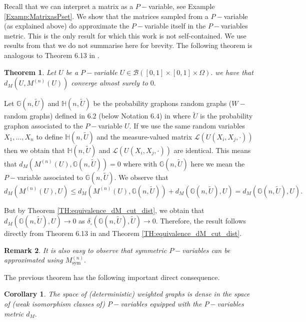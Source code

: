 \documentclass[11pt]{article}
\newtheorem{theorem}{Theorem}[section]
\newtheorem{corollary}{Corollary}[theorem]
\newtheorem{remark}[theorem]{Remark}
\newcommand{\cB}{{\mathcal B}}  %
\begin{document}
 Recall that we can interpret a matrix as a $P-$variable, see Example \ref{Examp:MatrixasPset}. We show that the matrices sampled from a $P-$variable (as explained above) do approximate the $P-$variable itself in the $P-$variables metric. This is the only result for which this work is not self-contained. We use results from \cite{abraham2023probabilitygraphons} that we do not summarise here for brevity. The following theorem is analogous to Theorem 6.13 in \cite{abraham2023probabilitygraphons}.

\begin{theorem}\label{ThmConVSubgraphs}
Let $U$ be a $P-$variable $U\in\cB([0,1]\times [0,1]\times \Omega).$ we have that $d_M(U,M^{(n)}(U))$ converge almost surely to $0.$ 
\end{theorem}
\proof
Let $\mathbb{G}(n,\widetilde U)$ and $\mathbb{H}(n,\widetilde U)$ be the probability graphons random graphs ($W-$random graphs) defined in $6.2$ (below Notation $6.4$) in \cite{abraham2023probabilitygraphons} where $\widetilde U$ is the probability graphon associated to the $P-$variable $U$. If we use the same random variables $X_1,\ldots,X_n$ to define $\mathbb{H}(n,\widetilde U)$ and the measure-valued matrix $\mathcal{L}(U(X_i,X_j,\cdot))$ then we obtain that $\mathbb{H}(n,\widetilde U)$ and $\mathcal{L}(U(X_i,X_j,\cdot))$ are identical. This means that $d_M(M^{(n)}(U), \mathbb{G}(n,\widetilde U))=0$ where with $\mathbb{G}(n,\widetilde U)$ here we mean the $P-$variable associated to $\mathbb{G}(n,\widetilde U).$ We observe that $$
d_M( M^{(n)}(U),U)\leq d_M(M^{(n)}(U), \mathbb{G}(n,\widetilde U))+d_M( \mathbb{G}(n,\widetilde U),U)=d_M( \mathbb{G}(n,\widetilde U),U).
$$

But by Theorem \ref{TH:equivalence_dM_cut_dist}, we obtain that $d_M( \mathbb{G}(n,\widetilde U),U)\rightarrow 0$ as $\delta_{\square}(\mathbb{G}(n,\widetilde U),\widetilde U)\rightarrow 0.$
Therefore, the result follows directly from Theorem 6.13 in \cite{abraham2023probabilitygraphons} and Theorem \ref{TH:equivalence_dM_cut_dist}.
\endproof

\begin{remark}
It is also easy to observe that symmetric $P-$variables can be approximated using $M^{(n)}_{\text{sym}}.$
\end{remark}

The previous theorem has the following important direct consequence.

\begin{corollary}
The space of (deterministic) weighted graphs is dense in the space of (weak isomorphism classes of) $P-$variables equipped with the $P-$variables metric $d_M.$
\end{corollary}
\end{document}
